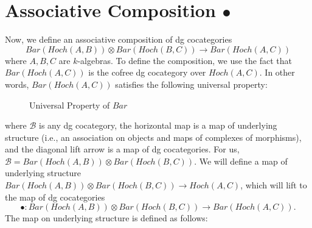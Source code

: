 \section{Associative Composition $\bullet$}
Now, we define an associative composition of 
dg cocategories 
$$Bar(Hoch(A,B)) \otimes Bar(Hoch(B,C))
\to Bar(Hoch(A,C))$$
where $A,B,C$ are $k$-algebras. To define 
the composition, we use the fact that 
$Bar(Hoch(A,C))$ is the cofree dg 
cocategory over $Hoch(A,C)$. In other 
words, $Bar(Hoch(A,C))$ satisfies 
the following universal property:
%
\begin{figure}[H]
\centerline{}
\caption{Universal Property of $Bar$}	
\end{figure}  
where $\mathcal{B}$ is any dg cocategory, 
the horizontal map is a map of underlying 
structure (i.e., an association on objects 
and maps of complexes of morphisms), and the 
diagonal lift arrow is a map of dg cocategories. 
For us, $\mathcal{B} = Bar(Hoch(A,B)) 
\otimes Bar(Hoch(B,C))$. We will define a map of 
underlying structure $Bar(Hoch(A,B)) \otimes 
Bar(Hoch(B,C)) \to Hoch(A,C)$, which will lift 
to the map of dg cocategories 
$$\bullet: Bar(Hoch(A,B)) \otimes 
Bar(Hoch(B,C)) \to Bar(Hoch(A,C)).$$
The map on underlying structure is defined 
as follows:
%
